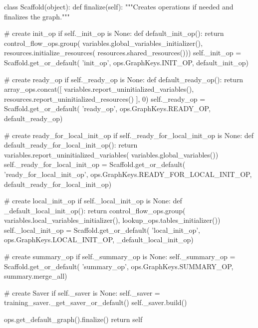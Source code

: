 \begin{content}
\begin{leftbar}
\begin{python}
class Scaffold(object):
  def finalize(self):
    """Creates operations if needed and finalizes the graph."""
    
    # create init\_op
    if self._init_op is None:
      def default_init_op():
        return control_flow_ops.group(
            variables.global_variables_initializer(),
            resources.initialize_resources(
              resources.shared_resources()))
      self._init_op = Scaffold.get_or_default(
          'init_op',
          ops.GraphKeys.INIT_OP,
          default_init_op)

    # create ready\_op
    if self._ready_op is None:
      def default_ready_op():
        return array_ops.concat([
            variables.report_uninitialized_variables(),
            resources.report_uninitialized_resources()
        ], 0)
      self._ready_op = Scaffold.get_or_default(
          'ready_op', 
          ops.GraphKeys.READY_OP,
          default_ready_op)
    
    # create ready\_for\_local\_init\_op
    if self._ready_for_local_init_op is None:
      def default_ready_for_local_init_op():
        return variables.report_uninitialized_variables(
            variables.global_variables())
      self._ready_for_local_init_op = Scaffold.get_or_default(
          'ready_for_local_init_op',
          ops.GraphKeys.READY_FOR_LOCAL_INIT_OP,
          default_ready_for_local_init_op)
    
    # create local\_init\_op
    if self._local_init_op is None:
      def _default_local_init_op():
        return control_flow_ops.group(
            variables.local_variables_initializer(),
            lookup_ops.tables_initializer())
      self._local_init_op = Scaffold.get_or_default(
          'local_init_op',
          ops.GraphKeys.LOCAL_INIT_OP,
          _default_local_init_op)
    
    # create summary\_op
    if self._summary_op is None:
      self._summary_op = Scaffold.get_or_default(
          'summary_op',
          ops.GraphKeys.SUMMARY_OP,
          summary.merge_all)
    
    # create Saver
    if self._saver is None:
      self._saver = training_saver._get_saver_or_default()
    self._saver.build()

    ops.get_default_graph().finalize()
    return self
\end{python}
\end{leftbar}


\end{content}

